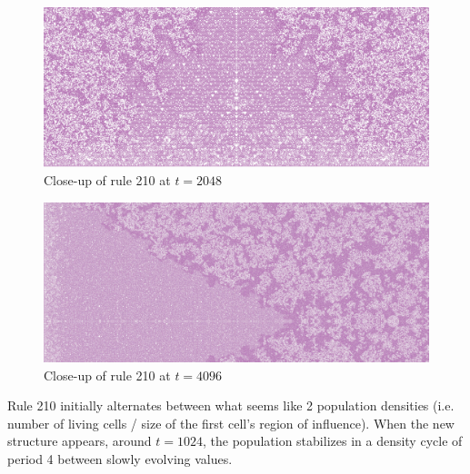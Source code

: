 \documentclass{article}
\begin{document}
\begin{figure}[H]
    \centering
    \includegraphics[width=\textwidth]{graphics/behavior/rule-210/rule-210-time-2048-close-up.jpg}
    \vspace{-16pt}
    \caption{Close-up of rule 210 at $t=2048$}
    \label{fig:rule-210-close-up-2048}
\end{figure}
\vspace{-10pt}
\begin{figure}[H]
    \centering
    \includegraphics[width=\textwidth]{graphics/behavior/rule-210/rule-210-time-4096-close-up.jpg}
    \vspace{-16pt}
    \caption{Close-up of rule 210 at $t=4096$}
    \label{fig:rule-210-close-up-4096}
\end{figure}

\noindent Rule 210 initially alternates between what seems like 2 population densities (i.e. number of living cells / size of the first cell's region of influence). When the new structure appears, around $t=1024$, the population stabilizes in a density cycle of period 4 between slowly evolving values.
\end{document}
